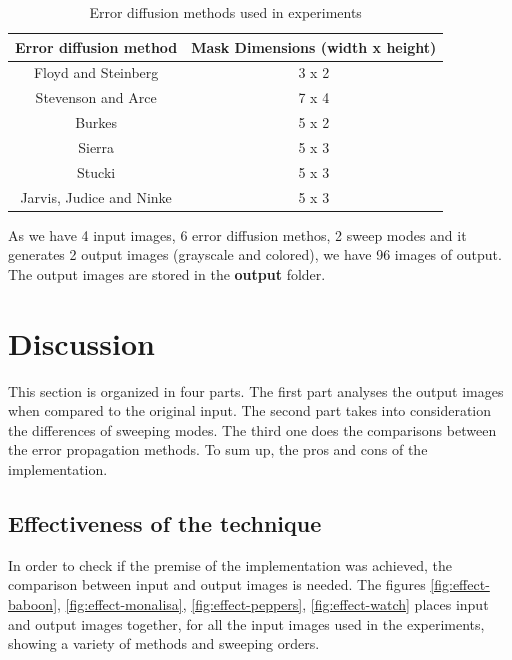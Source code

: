 \documentclass[]{IEEEtran}
\begin{document}
\begin{table}[h!]
  \centering
  \begin{center}
  \begin{tabular}{ |c|c| } 
   \hline
   Error diffusion method & Mask Dimensions (width x height) \\
   \hline
    Floyd and Steinberg &  3 x 2\\ 
   \hline
    Stevenson and Arce & 7 x 4\\
   \hline
    Burkes &  5 x 2\\ 
   \hline
    Sierra & 5 x 3\\
   \hline
    Stucki & 5 x 3\\
   \hline
    Jarvis, Judice and Ninke & 5 x 3 \\ 
   \hline
  \end{tabular}
  \caption{Error diffusion methods used in experiments}
  \label{table:masks}
  \end{center}
  \end{table}

As we have 4 input images, 6 error diffusion methos, 2 sweep modes and it generates 2 output images (grayscale and colored), we have 96 images of output. The output images are stored in the \textbf{output} folder.

\section{Discussion}
This section is organized in four parts. The first part analyses the output images when compared to the original input. The second part takes into consideration the differences of sweeping modes. The third one does the comparisons between the error propagation methods. To sum up, the pros and cons of the implementation.

\subsection{Effectiveness of the technique}
In order to check if the premise of the implementation was achieved, the comparison between input and output images is needed. The figures \ref{fig:effect-baboon}, \ref{fig:effect-monalisa}, \ref{fig:effect-peppers}, \ref{fig:effect-watch} places input and output images together, for all the input images used in the experiments, showing a variety of methods and sweeping orders. 
\end{document}

